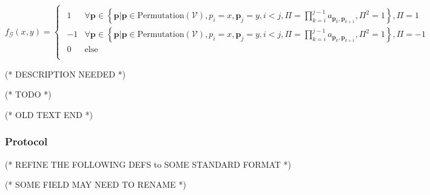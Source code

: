 \documentclass{article}
\begin{document}
\(f_{\mathcal{G}}(x,y)=\begin{cases}
 
\begin{array}{ll}
 1 & \forall \pmb{p}\in \left\{\pmb{p}|\pmb{p}\in \text{Permutation}(\mathcal{V}),p_i=x,\pmb{p}_j=y,i<j,\Pi =\prod _{k=i}^{j-1} a_{\pmb{p}_k,\pmb{p}_{k+1}},\Pi
^2=1\right\},\Pi =1 \\
 -1 & \forall \pmb{p}\in \left\{\pmb{p}|\pmb{p}\in \text{Permutation}(\mathcal{V}),p_i=x,\pmb{p}_j=y,i<j,\Pi =\prod _{k=i}^{j-1} a_{\pmb{p}_k,\pmb{p}_{k+1}},\Pi
^2=1\right\},\Pi =-1 \\
 0 & \text{else} \\
\end{array}

\end{cases}\)





(* DESCRIPTION NEEDED *)



(* TODO *)



(* OLD TEXT END *)


\subsubsection{Protocol}



(* REFINE THE FOLLOWING DEFS to SOME STANDARD FORMAT *)



(* SOME FIELD MAY NEED TO RENAME *)
\end{document}
